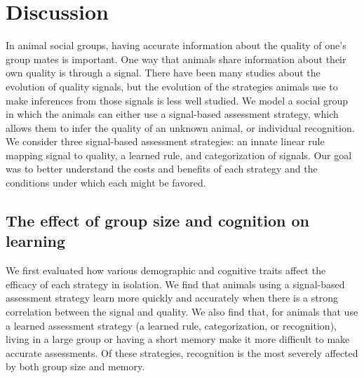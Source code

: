\section*{Discussion}

In animal social groups, having accurate information about the quality of one's group mates is important. One way that animals share information about their own quality is through a signal. There have been many studies about the evolution of quality signals, but the evolution of the strategies animals use to make inferences from those signals is less well studied. We model a social group in which the animals can either use a signal-based assessment strategy, which allows them to infer the quality of an unknown animal, or individual recognition. We consider three signal-based assessment strategies: an innate linear rule mapping signal to quality, a learned rule, and categorization of signals. Our goal was to better understand the costs and benefits of each strategy and the conditions under which each might be favored. 


\subsection*{The effect of group size and cognition on learning} 
We first evaluated how various demographic and cognitive traits affect the efficacy of each strategy in isolation. We  find that animals using a signal-based assessment strategy learn more quickly and accurately when there is a strong correlation between the signal and quality. We also find that, for animals that use a learned assessment strategy (a learned rule, categorization, or recognition), living in a large group or having a short memory make it more difficult to make accurate assessments. Of these strategies, recognition is the most severely affected by both group size and memory.  

